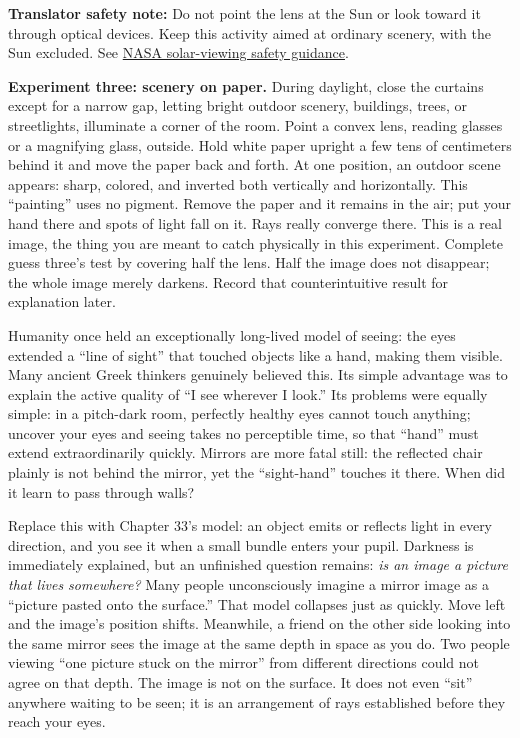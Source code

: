\begin{mainline}
\begin{experiment}
\textbf{Translator safety note:} Do not point the lens at the Sun or look toward it through optical devices. Keep this activity aimed at ordinary scenery, with the Sun excluded. See \href{https://science.nasa.gov/eclipses/safety/}{NASA solar-viewing safety guidance}.

\textbf{Experiment three: scenery on paper.} During daylight, close the curtains except for a narrow gap, letting bright outdoor scenery, buildings, trees, or streetlights, illuminate a corner of the room. Point a convex lens, reading glasses or a magnifying glass, outside. Hold white paper upright a few tens of centimeters behind it and move the paper back and forth. At one position, an outdoor scene appears: sharp, colored, and inverted both vertically and horizontally. This ``painting'' uses no pigment. Remove the paper and it remains in the air; put your hand there and spots of light fall on it. Rays really converge there. This is a real image, the thing you are meant to catch physically in this experiment. Complete guess three's test by covering half the lens. Half the image does not disappear; the whole image merely darkens. Record that counterintuitive result for explanation later.

\end{experiment}


Humanity once held an exceptionally long-lived model of seeing: the eyes extended a ``line of sight'' that touched objects like a hand, making them visible. Many ancient Greek thinkers genuinely believed this. Its simple advantage was to explain the active quality of ``I see wherever I look.'' Its problems were equally simple: in a pitch-dark room, perfectly healthy eyes cannot touch anything; uncover your eyes and seeing takes no perceptible time, so that ``hand'' must extend extraordinarily quickly. Mirrors are more fatal still: the reflected chair plainly is not behind the mirror, yet the ``sight-hand'' touches it there. When did it learn to pass through walls?

Replace this with Chapter 33's model: an object emits or reflects light in every direction, and you see it when a small bundle enters your pupil. Darkness is immediately explained, but an unfinished question remains: \emph{is an image a picture that lives somewhere?} Many people unconsciously imagine a mirror image as a ``picture pasted onto the surface.'' That model collapses just as quickly. Move left and the image's position shifts. Meanwhile, a friend on the other side looking into the same mirror sees the image at the same depth in space as you do. Two people viewing ``one picture stuck on the mirror'' from different directions could not agree on that depth. The image is not on the surface. It does not even ``sit'' anywhere waiting to be seen; it is an arrangement of rays established before they reach your eyes.


\end{mainline}
